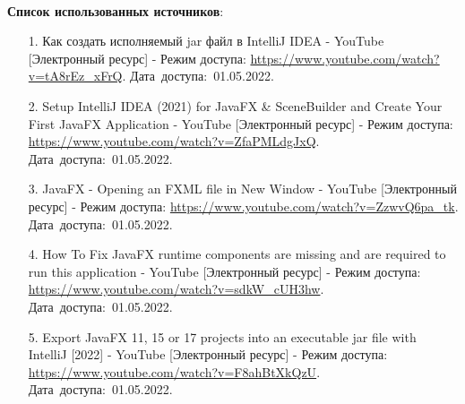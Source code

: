 \documentclass[12pt, a4paper, simple]{eskdtext}
\begin{document}
    \paragraph{} \textbf{Список использованных источников}:
    \begin{enumerate}
        \item[1.] Как создать исполняемый jar файл в IntelliJ IDEA - YouTube [Электронный ресурс]
        - Режим доступа: \url{https://www.youtube.com/watch?v=tA8rEz_xFrQ}.
        Дата~доступа:~01.05.2022.
        \item[2.] Setup IntelliJ IDEA (2021) for JavaFX \& SceneBuilder and Create Your First JavaFX Application - YouTube [Электронный ресурс]
        - Режим доступа: \url{https://www.youtube.com/watch?v=ZfaPMLdgJxQ}.
        Дата~доступа:~01.05.2022.
        \item[3.] JavaFX - Opening an FXML file in New Window - YouTube [Электронный ресурс]
        - Режим доступа: \url{https://www.youtube.com/watch?v=ZzwvQ6pa_tk}.
        Дата~доступа:~01.05.2022.
        \item[4.] How To Fix JavaFX runtime components are missing and are required to run this application - YouTube [Электронный ресурс]
        - Режим доступа: \url{https://www.youtube.com/watch?v=sdkW_cUH3hw}.
        Дата~доступа:~01.05.2022.
        \item[5.] Export JavaFX 11, 15 or 17 projects into an executable jar file with IntelliJ [2022] - YouTube [Электронный ресурс]
        - Режим доступа: \url{https://www.youtube.com/watch?v=F8ahBtXkQzU}.
        Дата~доступа:~01.05.2022.
    \end{enumerate}
    \newpage
\end{document}
